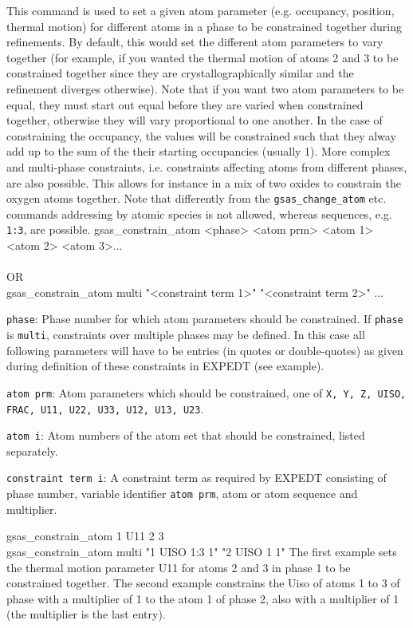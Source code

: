 {
This command is used to set a given atom parameter (e.g. occupancy, position, thermal motion) for different atoms in a phase to be constrained together during refinements.  By default, this would set the different atom parameters to vary together (for example, if you wanted the thermal motion of atoms 2 and 3 to be constrained together since they are crystallographically similar and the refinement diverges otherwise).  Note that if you want two atom parameters to be equal, they must start out equal before they are varied when constrained together, otherwise they will vary proportional to one another.  In the case of constraining the occupancy, the values will be constrained such that they alway add up to the sum of the their starting occupancies (usually 1). More complex and multi-phase constraints, i.e. constraints affecting atoms from different phases, are also possible. This allows for instance in a mix of two oxides to constrain the oxygen atoms together. Note that differently from the \texttt{gsas\_change\_atom} etc. commands addressing by atomic species is not allowed, whereas sequences, e.g. \texttt{1:3}, are possible.
}{
gsas\_constrain\_atom <phase> <atom prm> <atom 1> <atom 2> <atom 3>...\\
\\
OR
\\
gsas\_constrain\_atom multi "<constraint term 1>" "<constraint term 2>" ...
}{
\item \texttt{phase}:  Phase number for which atom parameters should be constrained. If \texttt{phase} is \texttt{multi}, constraints over multiple phases may be defined. In this case all following parameters will have to be entries (in quotes or double-quotes) as given during definition of these constraints in EXPEDT (see example).
\item \texttt{atom prm}: Atom parameters which should be constrained, one of \texttt{X, Y, Z, UISO, FRAC, U11, U22, U33, U12, U13, U23}.
\item \texttt{atom i}:  Atom numbers of the atom set that should be constrained, listed separately.
\item \texttt{constraint term i}:  A constraint term as required by EXPEDT consisting of phase number, variable identifier \texttt{atom prm}, atom or atom sequence and multiplier.
}{
gsas\_constrain\_atom 1 U11 2 3 \\
gsas\_constrain\_atom multi "1 UISO 1:3 1" "2 UISO 1 1"
}{
The first example sets the thermal motion parameter U11 for atoms 2 and 3 in phase 1 to be constrained together. The second example constrains the Uiso of atoms 1 to 3 of phase with a multiplier of 1 to the atom 1 of phase 2, also with a multiplier of 1 (the multiplier is the last entry).
}

